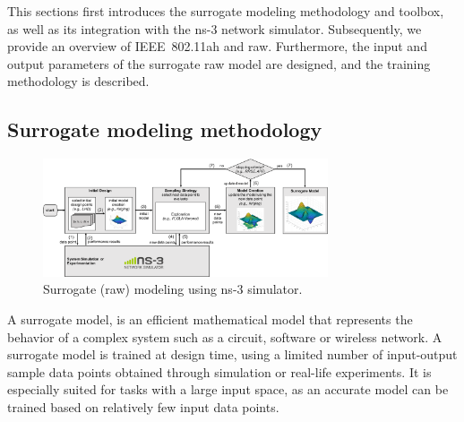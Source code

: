 


This sections first introduces the surrogate modeling methodology 
and toolbox, as well as its integration with the ns-3 network
simulator. Subsequently, we provide an overview of  IEEE~802.11ah and \gls{raw}. Furthermore, the input and output parameters of the surrogate \gls{raw} model are designed, and the training methodology is described. 


\subsection{Surrogate modeling methodology}


\begin{figure}[t]
  \centering
  \includegraphics[width=0.75\textwidth]{figures/surrogate_modeling_approach_raw}
  \caption{Surrogate (\gls{raw}) modeling using ns-3 simulator. \label{fig:sumo-ns3}}
\end{figure}

 A surrogate model, is an efficient mathematical model that represents the behavior of a complex system such as a circuit, software or wireless network. A surrogate model is trained at design time, using a limited number of input-output sample data points obtained through simulation or real-life experiments. It is especially suited for tasks with a large input space, as an accurate model can be trained based on relatively few input data points.
 
